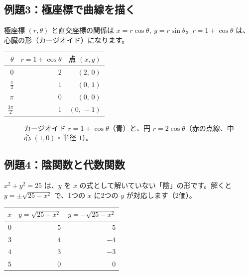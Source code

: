 \documentclass[a4paper,11pt,openany]{ltjsbook}
\begin{document}
\subsection*{例題3：極座標で曲線を描く}

極座標 $(r,\theta)$ と直交座標の関係は $x=r\cos\theta,\ y=r\sin\theta$。$r=1+\cos\theta$ は、心臓の形（カージオイド）になります。

\begin{center}
\begin{tabular}{rrr}
\toprule
$\theta$ & $r=1+\cos\theta$ & 点 $(x,y)$\\
\midrule
$0$ & $2$ & $(2,\,0)$\\
$\frac\pi2$ & $1$ & $(0,\,1)$\\
$\pi$ & $0$ & $(0,\,0)$\\
$\frac{3\pi}2$ & $1$ & $(0,\,-1)$\\
\bottomrule
\end{tabular}
\end{center}

\begin{figure}[htbp]
\centering
{}
\caption{カージオイド $r=1+\cos\theta$（青）と、円 $r=2\cos\theta$（赤の点線、中心 $(1,0)$・半径 $1$）。}
\end{figure}

\subsection*{例題4：陰関数と代数関数}

$x^2+y^2=25$ は、$y$ を $x$ の式として解いていない「陰」の形です。解くと $y=\pm\sqrt{25-x^2}$ で、1つの $x$ に2つの $y$ が対応します（2価）。

\begin{center}
\begin{tabular}{rrr}
\toprule
$x$ & $y=\sqrt{25-x^2}$ & $y=-\sqrt{25-x^2}$\\
\midrule
$0$ & $5$ & $-5$\\
$3$ & $4$ & $-4$\\
$4$ & $3$ & $-3$\\
$5$ & $0$ & $0$\\
\bottomrule
\end{tabular}
\end{center}
\end{document}
